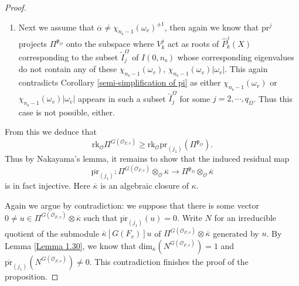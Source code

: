 \documentclass[12pt,oneside,reqno]{amsart}
\theoremstyle{plain}
\begin{document}
\begin{proof}
\begin{enumerate}
			
			\item 
			Next we assume that
			$\overline{\alpha}\neq\chi_{n_{\mathrm{s}}-1}(\omega_v)^{\pm1}$,
			then again we know that
			$\mathrm{pr}^j$
			projects
			$\Pi^{\mathfrak{p}_\Omega}$
			onto the subspace
			where
			$V_k^j$
			act as roots of
			$\widehat{P}_k^j(X)$
			corresponding to the subset
			$\widetilde{I}_j^\Omega$ of $I(0,n_\mathrm{s})$
			whose corresponding eigenvalues do not contain
			any of these
			$\chi_{n_{\mathrm{s}}-1}(\omega_v)$,
			$\chi_{n_{\mathrm{s}}-1}(\omega_v)|\omega_v|$.
			This again contradicts
			Corollary
			\ref{semi-simplification of pi}
			as either
			$\chi_{n_{\mathrm{s}}-1}(\omega_v)$
			or
			$\chi_{n_{\mathrm{s}}-1}(\omega_v)|\omega_v|$
			appears in such a subset $\widetilde{I}_j^\Omega$
			for some $j=2,\cdots,q_\Omega$.
			Thus this case is not possible, either.
		\end{enumerate}
		
		
		
		
		
		
		
		
		
		
		
		
		
		
		
		
		
		
		
		
		
		
		
		
		
		
		
		
		
		
		
		
		From this we deduce that
		\[
		\mathrm{rk}_\mathcal{O}
		\Pi^{ G(\mathcal{O}_{F,v})}
		\ge
		\mathrm{rk}_\mathcal{O}
		\mathrm{pr}_{(j_1)}
		(\Pi^{\mathfrak{p}_\Omega}).
		\]
		Thus by Nakayama's lemma,
		it remains to show that
		the induced residual map
		\[
		\overline{\mathrm{pr}}_{(j_1)}
		\colon
		\Pi^{ G(\mathcal{O}_{F,v})}
		\otimes_{\mathcal{O}}\overline{\kappa}
		\rightarrow
		\Pi^{\mathfrak{p}_\Omega}
		\otimes_{\mathcal{O}}\overline{\kappa}
		\]
		is in fact injective.
		Here
		$\overline{\kappa}$
		is an algebraic closure of $\kappa$.
		
		
		Again we argue by contradiction:
		we suppose that there is some vector
		$0\ne u\in
		\Pi^{ G(\mathcal{O}_{F,v})}
		\otimes\overline{\kappa}$
		such that
		$\overline{\mathrm{pr}}_{(j_1)}(u)=0$.
		Write
		$N$
		for an irreducible quotient of
		the submodule
		$\overline{\kappa}[ G(F_v)]u$
		of $\Pi^{ G(\mathcal{O}_{F,v})}
		\otimes\overline{\kappa}$
		generated by $u$.
		By Lemma
		\ref{Lemma 1.30},
		we know that
		$\mathrm{dim}_{\overline{\kappa}}
		(N^{ G(\mathcal{O}_{F,v})})=1$
		and
		$\overline{\mathrm{pr}}_{(j_1)}
		(N^{ G(\mathcal{O}_{F,v})})\ne0$.
		This contradiction finishes the proof of 
		the proposition.
		
	\end{proof}
	
\end{document}
